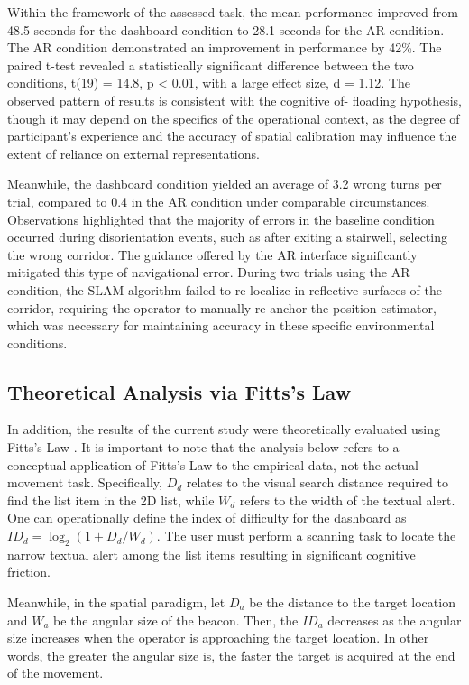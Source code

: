 \documentclass[conference]{IEEEtran}
\begin{document}
Within the framework of the assessed task, the mean performance improved from 48.5 seconds for the dashboard condition to 28.1 seconds for the AR condition. The AR condition demonstrated an improvement in performance by 42\%. The paired t-test revealed a statistically significant difference between the two conditions, t(19) = 14.8, p < 0.01, with a large effect size, d = 1.12. The observed pattern of results is consistent with the cognitive of- floading hypothesis, though it may depend on the specifics of the operational context, as the degree of participant’s experience and the accuracy of spatial calibration may influence the extent of reliance on external representations.

Meanwhile, the dashboard condition yielded an average of 3.2 wrong turns per trial, compared to 0.4 in the AR condition under comparable circumstances. Observations highlighted that the majority of errors in the baseline condition occurred during disorientation events, such as after exiting a stairwell, selecting the wrong corridor. The guidance offered by the AR interface significantly mitigated this type of navigational error. During two trials using the AR condition, the SLAM algorithm failed to re-localize in reflective surfaces of the corridor, requiring the operator to manually re-anchor the position estimator, which was necessary for maintaining accuracy in these specific environmental conditions.

\subsection{Theoretical Analysis via Fitts's Law}
In addition, the results of the current study were theoretically evaluated using Fitts’s Law \cite{b7}. It is important to note that the analysis below refers to a conceptual application of Fitts’s Law to the empirical data, not the actual movement task. Specifically, $D_d$ relates to the visual search distance required to find the list item in the 2D list, while $W_d$ refers to the width of the textual alert. One can operationally define the index of difficulty for the dashboard as $ID_d = \log_2(1 + D_d/W_d)$. The user must perform a scanning task to locate the narrow textual alert among the list items resulting in significant cognitive friction.

Meanwhile, in the spatial paradigm, let $D_a$ be the distance to the target location and $W_a$ be the angular size of the beacon. Then, the $ID_a$ decreases as the angular size increases when the operator is approaching the target location. In other words, the greater the angular size is, the faster the target is acquired at the end of the movement.
\end{document}
